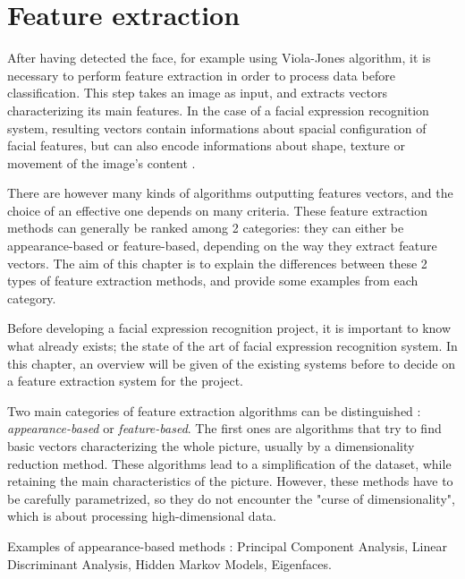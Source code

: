 \chapter{Feature extraction}
\label{chap:extraction}

\noindent After having detected the face, for example using Viola-Jones algorithm, it is necessary to perform feature extraction in order to process data before classification. 
This step takes an image as input, and extracts vectors characterizing its main features. In the case of a facial expression recognition system, resulting vectors contain informations about spacial configuration of facial features, but can also encode informations about shape, texture or movement of the image's content \cite{CHI03}.
\newline

\noindent There are however many kinds of algorithms outputting features vectors, and the choice of an effective one depends on many criteria. These feature extraction methods can generally be ranked among 2 categories: they can either be appearance-based or feature-based, depending on the way they extract feature vectors. The aim of this chapter is to explain the differences between these 2 types of feature extraction methods, and provide some examples from each category.
\newline

\vspace{\baselineskip}
\noindent Before developing a facial expression recognition project, it is important to know what already exists; the state of the art of facial expression recognition system. In this chapter, an overview will be given of the existing systems before to decide on a feature extraction system for the project.
\newline

\noindent Two main categories of feature extraction algorithms can be distinguished : \textit{appearance-based} or \textit{feature-based}. The first ones are algorithms that try to find basic vectors characterizing the whole picture, usually by a dimensionality reduction method. These algorithms lead to a simplification of the dataset, while retaining the main characteristics of the picture. However, these methods have to be carefully parametrized, so they do not encounter the "curse of dimensionality", which is about processing high-dimensional data.
\vspace{\baselineskip}

\noindent Examples of appearance-based methods : Principal Component Analysis, Linear Discriminant Analysis, Hidden Markov Models, Eigenfaces.
\newline

